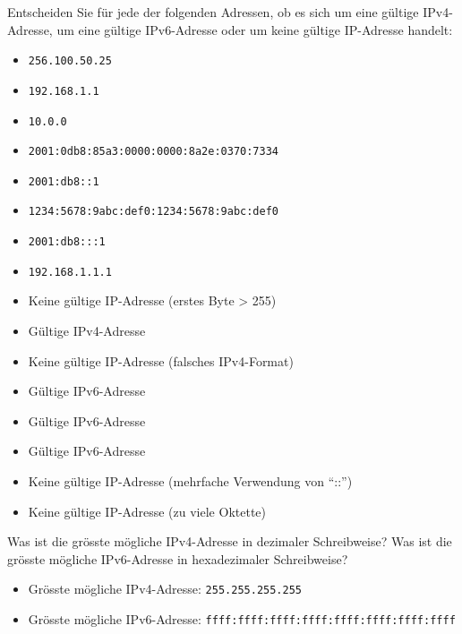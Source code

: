 \begin{myexercise}
	Entscheiden Sie für jede der folgenden Adressen, ob es sich um eine gültige \gls{IP}v4-Adresse, um eine gültige \gls{IP}v6-Adresse oder um keine gültige \gls{IP}-Adresse handelt:
	\begin{itemize}
		\item \texttt{256.100.50.25}
		\item \texttt{192.168.1.1}
		\item \texttt{10.0.0}
		\item \texttt{2001:0db8:85a3:0000:0000:8a2e:0370:7334}
		\item \texttt{2001:db8::1}
		\item \texttt{1234:5678:9abc:def0:1234:5678:9abc:def0}
		\item \texttt{2001:db8:::1}
		\item \texttt{192.168.1.1.1}
	\end{itemize}
	\begin{myanswer}
		\begin{itemize}
			\item Keine gültige \gls{IP}-Adresse (erstes Byte > 255)
			\item Gültige \gls{IP}v4-Adresse
			\item Keine gültige \gls{IP}-Adresse (falsches IPv4-Format)
			\item Gültige \gls{IP}v6-Adresse
			\item Gültige \gls{IP}v6-Adresse
			\item Gültige \gls{IP}v6-Adresse
			\item Keine gültige \gls{IP}-Adresse (mehrfache Verwendung von \enquote{::})
			\item Keine gültige \gls{IP}-Adresse (zu viele Oktette)
		\end{itemize}
	\end{myanswer}
\end{myexercise}

\begin{myexercise}
	Was ist die grösste mögliche \gls{IP}v4-Adresse in dezimaler Schreibweise? Was ist die grösste mögliche \gls{IP}v6-Adresse in hexadezimaler Schreibweise?
	\begin{myanswer}
		\begin{itemize}
			\item Grösste mögliche \gls{IP}v4-Adresse: \texttt{255.255.255.255}
			\item Grösste mögliche \gls{IP}v6-Adresse: \texttt{ffff:ffff:ffff:ffff:ffff:ffff:ffff:ffff}
		\end{itemize}
	\end{myanswer}
\end{myexercise}

